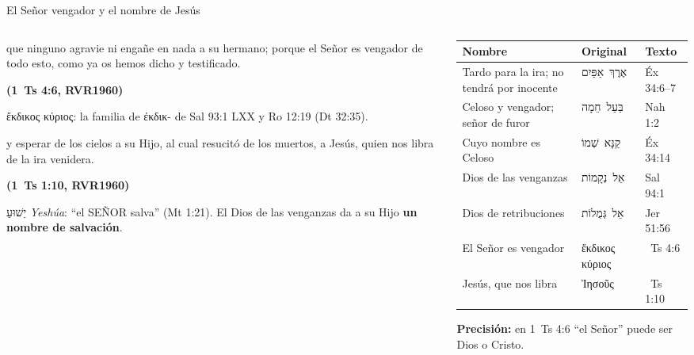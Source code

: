 \documentclass[hyperref={bookmarks=false},aspectratio=169]{beamer}
\newcommand{\heb}[1]{\mbox{\foreignlanguage{hebrew}{#1}}}
\newcommand{\grc}[1]{\foreignlanguage{ancientgreek}{#1}}
\newcommand{\SENOR}{S{\fontsize{0.78em}{1em}\selectfont EÑOR}}
\newcommand{\fuente}[1]{\par\hfill{\upshape\bfseries\footnotesize\textcolor{azul}{#1}}}
\newcommand{\destacar}[1]{\textbf{\textcolor{azul}{#1}}}
\newcommand{\precision}[1]{{\footnotesize\color{gris}\textbf{Precisión:} #1}}
\begin{document}
\begin{frame}{El Señor vengador y el nombre de Jesús}
\begin{columns}[c,onlytextwidth]
\begin{column}{0.46\textwidth}
\begin{cita}que ninguno agravie ni engañe en nada a su hermano; porque el Señor es vengador de todo esto, como ya os hemos dicho y testificado.\fuente{(1~Ts 4:6, RVR1960)}\end{cita}
\scriptsize\grc{ἔκδικος κύριος}: la familia de \grc{ἐκδικ-} de Sal 93:1 LXX y Ro 12:19 (Dt 32:35).
\begin{cita}y esperar de los cielos a su Hijo, al cual resucitó de los muertos, a Jesús, quien nos libra de la ira venidera.\fuente{(1~Ts 1:10, RVR1960)}\end{cita}
\scriptsize\heb{יֵשׁוּעַ} \emph{Yeshúa}: ``el \SENOR{} salva'' (Mt 1:21). El Dios de las venganzas da a su Hijo \destacar{un nombre de salvación}.
\end{column}
\begin{column}{0.52\textwidth}\scriptsize
\renewcommand{\arraystretch}{1.12}
\begin{tabular}{@{}>{\RaggedRight\arraybackslash}p{2.5cm}>{\RaggedRight\arraybackslash}p{2.2cm}>{\RaggedRight\arraybackslash}p{1.7cm}@{}}
\toprule
\textbf{Nombre} & \textbf{Original} & \textbf{Texto} \\ \midrule
Tardo para la ira; no tendrá por inocente & \heb{אֶרֶךְ אַפַּיִם} & Éx 34:6--7 \\
Celoso y vengador; señor de furor & \heb{בַּעַל חֵמָה} & Nah 1:2 \\
Cuyo nombre es Celoso & \heb{קַנָּא שְׁמוֹ} & Éx 34:14 \\
Dios de las venganzas & \heb{אֵל נְקָמוֹת} & Sal 94:1 \\
Dios de retribuciones & \heb{אֵל גְּמֻלוֹת} & Jer 51:56 \\
El Señor es vengador & \grc{ἔκδικος κύριος} & 1~Ts 4:6 \\
Jesús, que nos libra & \grc{Ἰησοῦς} & 1~Ts 1:10 \\
\bottomrule
\end{tabular}\par\smallskip
\precision{en 1~Ts 4:6 ``el Señor'' puede ser Dios o Cristo.}
\end{column}
\end{columns}
\end{frame}

\end{document}
